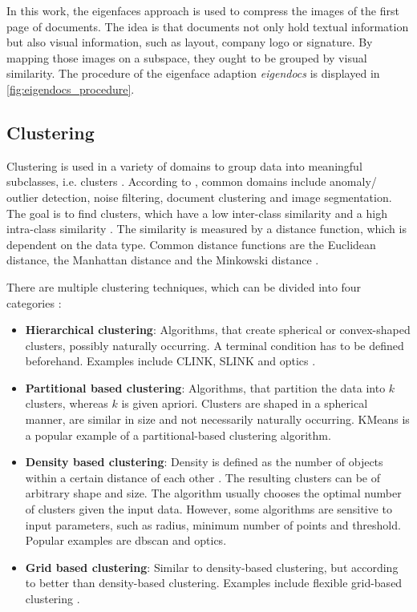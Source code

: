 In this work, the eigenfaces approach is used to compress the images of the first page of documents.
The idea is that documents not only hold textual information but also visual information, such as layout, company logo or signature.
By mapping those images on a subspace, they ought to be grouped by visual similarity.
The procedure of the eigenface adaption \textit{eigendocs} is displayed in \autoref{fig:eigendocs_procedure}.



\subsection{Clustering}\label{subsec:clustering}

Clustering is used in a variety of domains to group data into meaningful subclasses, i.e. clusters \cite{OPTICS2013, OPTICS2014, OPTICS_kMeans_2016}.
According to \citeauthor{OPTICS2013}, common domains include anomaly/ outlier detection, noise filtering, document clustering and image segmentation. 
The goal is to find clusters, which have a low inter-class similarity and a high intra-class similarity \cite{OPTICS2013}.
The similarity is measured by a distance function, which is dependent on the data type. 
Common distance functions are the Euclidean distance, the Manhattan distance and the Minkowski distance \cite{OPTICS_kMeans_2016}.

There are multiple clustering techniques, which can be divided into four categories \cite{OPTICS2016}: 
\begin{itemize}
    \item \textbf{Hierarchical clustering}:
    Algorithms, that create spherical or convex-shaped clusters, possibly naturally occurring. 
    A terminal condition has to be defined beforehand.
    Examples include CLINK, SLINK \cite{OPTICS2014} and \ac{optics} \cite{OPTICS2013}.

    \item \textbf{Partitional based clustering}: 
    Algorithms, that partition the data into $k$ clusters, whereas $k$ is given apriori.
    Clusters are shaped in a spherical manner, are similar in size and not necessarily naturally occurring.
    KMeans is a popular example of a partitional-based clustering algorithm.

    \item \textbf{Density based clustering}:
    Density is defined as the number of objects within a certain distance of each other \cite{OPTICS_kMeans_2016}.
    The resulting clusters can be of arbitrary shape and size.
    The algorithm usually chooses the optimal number of clusters given the input data.
    However, some algorithms are sensitive to input parameters, such as radius, minimum number of points and threshold.
    Popular examples are \ac{dbscan} and \ac{optics}.
    
    \item \textbf{Grid based clustering}:
    Similar to density-based clustering, but according to \citeauthor{OPTICS2016} better than density-based clustering.
    Examples include flexible grid-based clustering \cite{OPTICS2014}.
    
\end{itemize}

